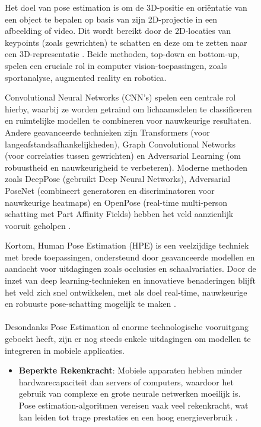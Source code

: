 \begin{figure}[h]
Het doel van pose estimation is om de 3D-positie en oriëntatie van een object te bepalen op basis van zijn 2D-projectie in een afbeelding of video. 
Dit wordt bereikt door de 2D-locaties van keypoints (zoals gewrichten) te schatten en deze om te zetten naar een 3D-representatie \autocite{SulongEtAl2023}. 
Beide methoden, top-down en bottom-up, spelen een cruciale rol in computer vision-toepassingen, zoals sportanalyse, augmented reality en robotica.

\medskip

Convolutional Neural Networks (CNN's) spelen een centrale rol hierby, waarbij ze worden getraind om lichaamsdelen te classificeren en ruimtelijke modellen te combineren voor nauwkeurige resultaten. 
Andere geavanceerde technieken zijn Transformers (voor langeafstandsafhankelijkheden), Graph Convolutional Networks (voor correlaties tussen gewrichten) en Adversarial Learning (om robuustheid en nauwkeurigheid te verbeteren). 
Moderne methoden zoals DeepPose (gebruikt Deep Neural Networks), Adversarial PoseNet (combineert generatoren en discriminatoren voor nauwkeurige heatmaps) en OpenPose (real-time multi-person schatting met Part Affinity Fields) hebben het veld aanzienlijk vooruit geholpen \autocite{ZhaoEtAl2024}.

\medskip

Kortom, Human Pose Estimation (HPE) is een veelzijdige techniek met brede toepassingen, ondersteund door geavanceerde modellen en aandacht voor uitdagingen zoals occlusies en schaalvariaties. 
Door de inzet van deep learning-technieken en innovatieve benaderingen blijft het veld zich snel ontwikkelen, met als doel real-time, nauwkeurige en robuuste pose-schatting mogelijk te maken \autocite{DongEtAl2024}.


\paragraph{}%
\label{par:uitdagingen-van-pose-estimation-op-mobiele-apparaten}

Desondanks Pose Estimation al enorme technologische vooruitgang geboekt heeft, zijn er nog steeds enkele uitdagingen om modellen te integreren in mobiele applicaties.

\begin{itemize}
    \item \textbf{Beperkte Rekenkracht}: 
    Mobiele apparaten hebben minder hardwarecapaciteit dan servers of computers, waardoor het gebruik van complexe en grote neurale netwerken moeilijk is. Pose estimation-algoritmen vereisen vaak veel rekenkracht, wat kan leiden tot trage prestaties en een hoog energieverbruik \autocite{LiuEtAl2022}.


\end{itemize}
\end{figure}
